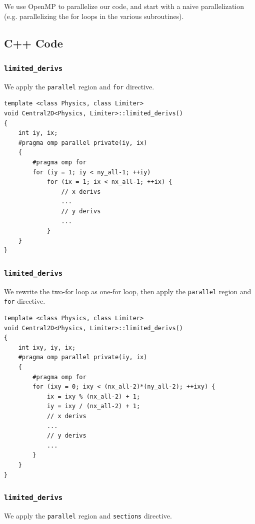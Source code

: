 \documentclass[12pt]{article}
\numberwithin{equation}{section}
\begin{document}
\normalsize
We use OpenMP to parallelize our code, and start with a naive parallelization (e.g. parallelizing the for loops in the various subroutines).

\subsection{C++ Code}

\subsubsection{\texttt{limited\_derivs}}

We apply the \texttt{parallel} region and \texttt{for} directive.

\scriptsize
\begin{lstlisting}
template <class Physics, class Limiter>
void Central2D<Physics, Limiter>::limited_derivs()
{
    int iy, ix;
    #pragma omp parallel private(iy, ix)
    {
        #pragma omp for
        for (iy = 1; iy < ny_all-1; ++iy)
            for (ix = 1; ix < nx_all-1; ++ix) {
                // x derivs
                ...
                // y derivs
                ...
            }
    }
}
\end{lstlisting}

\subsubsection{\texttt{limited\_derivs}}

\normalsize
We rewrite the two-for loop as one-for loop, then apply the \texttt{parallel} region and \texttt{for} directive.

\scriptsize
\begin{lstlisting}
template <class Physics, class Limiter>
void Central2D<Physics, Limiter>::limited_derivs()
{
    int ixy, iy, ix;
    #pragma omp parallel private(iy, ix)
    {
        #pragma omp for
        for (ixy = 0; ixy < (nx_all-2)*(ny_all-2); ++ixy) {
            ix = ixy % (nx_all-2) + 1;
            iy = ixy / (nx_all-2) + 1;
            // x derivs
            ...
            // y derivs
            ...
        }
    }
}
\end{lstlisting}

\subsubsection{\texttt{limited\_derivs}}

\normalsize
We apply the \texttt{parallel} region and \texttt{sections} directive.
\end{document}

